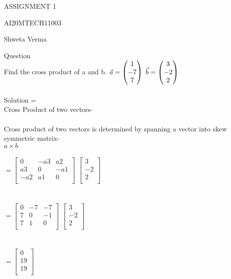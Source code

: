 \documentclass[11pt]{article}
\newcommand{\myvec}[1]{\ensuremath{\begin{pmatrix}#1\end{pmatrix}}}
\begin{document}
\begin{center}
\large ASSIGNMENT 1

AI20MTECH11003

Shweta Verma
\end{center}



\large Question
\\

Find the cross product of a and b.
$
\\
\\
\vec{a} = \myvec{1\\-7\\7}
$
$
\\
\\
\\
\vec{b} = \myvec{3\\-2\\2}
$
\\
\\
\large Solution =
\\
Cross Product of two vectors- 
\\
\\
Cross product of two vectors is determined by spanning a vector into skew symmetric matrix-
\\
$a \times b$
\\
\\
$
= \begin{bmatrix}
   0 & -a3 & a2\\
   a3 & 0 & -a1\\
   -a2 & a1 & 0\\
\end{bmatrix}
$
$
\begin{bmatrix}
 3\\
 -2\\
 2\\
\end{bmatrix}
$
\\
\\
\\
$
= \begin{bmatrix}
  0 & -7 & -7\\
  7 & 0 & -1\\
  7 & 1 & 0\\
\end{bmatrix}
$
$
\begin{bmatrix}
 3\\
 -2\\
 2\\
\end{bmatrix}
$
\\
\\
\\
$
=\begin{bmatrix}
 0\\
 19\\
 19\\
\end{bmatrix}
$
\end{document}

